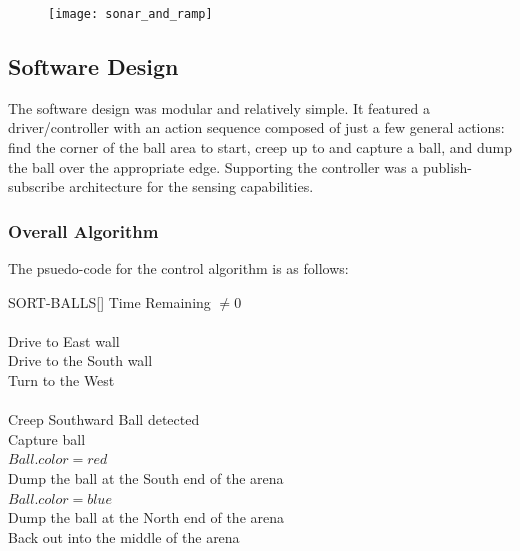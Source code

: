 \documentclass{article}
\begin{document}
  \begin{figure}[h]
    \centering
    \texttt{[image: sonar\_and\_ramp]}
    \caption{}
    \label{fig:sonar_and_bump_sensors}
  \end{figure}

\newpage
\subsection{Software Design}
The software design was modular and relatively simple. It featured a driver/controller with an action sequence composed of just a few general actions: find the corner of the ball area to start, creep up to and capture a ball, and dump the ball over the appropriate edge. Supporting the controller was a publish-subscribe architecture for the sensing capabilities.

\subsubsection{Overall Algorithm}
The psuedo-code for the control algorithm is as follows: \\
\begin{algorithm}{SORT-BALLS}[]{}
  \qwhile Time Remaining $\neq 0$ \\
  \qdo \\
    Drive to East wall \\
    Drive to the South wall \\
    Turn to the West \\
    \qrepeat \\
      Creep Southward
    \quntil Ball detected \\
    Capture ball \\
    \qif $Ball.color = red$ \\
      \qthen Dump the ball at the South end of the arena \\
      \qelse \qif $Ball.color = blue$ \\
        \qthen Dump the ball at the North end of the arena \qfi \qfi \\

    Back out into the middle of the arena
  \qend
\end{algorithm}
\end{document}
